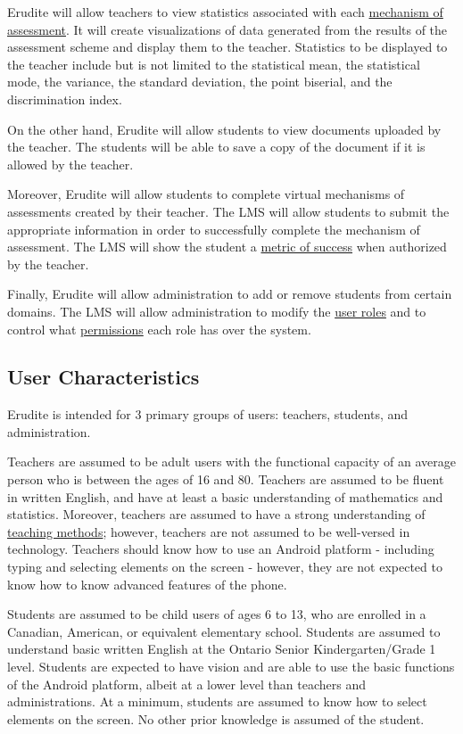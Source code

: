 \documentclass[]{article}
\begin{document}
Erudite will allow teachers to view statistics associated with each
\underline{mechanism of assessment}. It will create visualizations of data generated from
the results of the assessment scheme and display them to the teacher. Statistics
to be displayed to the teacher include but is not limited to the statistical
mean, the statistical mode, the variance, the standard deviation, the point
biserial, and the discrimination index.

On the other hand, Erudite will allow students to view documents uploaded by
the teacher. The students will be able to save a copy of the document if it is
allowed by the teacher.

Moreover, Erudite will allow students to complete virtual mechanisms of
assessments created by their teacher. The LMS will allow students to submit the
appropriate information in order to successfully complete the mechanism of
assessment. The LMS will show the student a \underline{metric of success} when
authorized by the teacher.

Finally, Erudite will allow administration to add or remove students from
certain domains. The LMS will allow administration to modify the
\underline{user roles} and to control what \underline{permissions} each role has
over the system.

\subsection{User Characteristics}
\label{sub:user_characteristics}
Erudite is intended for 3 primary groups of users: teachers, students, and
administration.

Teachers are assumed to be adult users with the functional capacity of an
average person who is between the ages of 16 and 80. Teachers are assumed to be
fluent in written English, and have at least a basic understanding of
mathematics and statistics. Moreover, teachers are assumed to have a strong
understanding of \underline{teaching methods}; however, teachers are not assumed to be
well-versed in technology. Teachers should know how to use an Android platform
- including typing and selecting elements on the screen - however, they are not
expected to know how to know advanced features of the phone.

Students are assumed to be child users of ages 6 to 13, who are enrolled in a
Canadian, American, or equivalent elementary school. Students are assumed to
understand basic written English at the Ontario Senior Kindergarten/Grade 1
level. Students are expected to have vision and are able to use the basic
functions of the Android platform, albeit at a lower level than teachers and
administrations. At a minimum, students are assumed to know how to select
elements on the screen. No other prior knowledge is assumed of the student.
\end{document}
